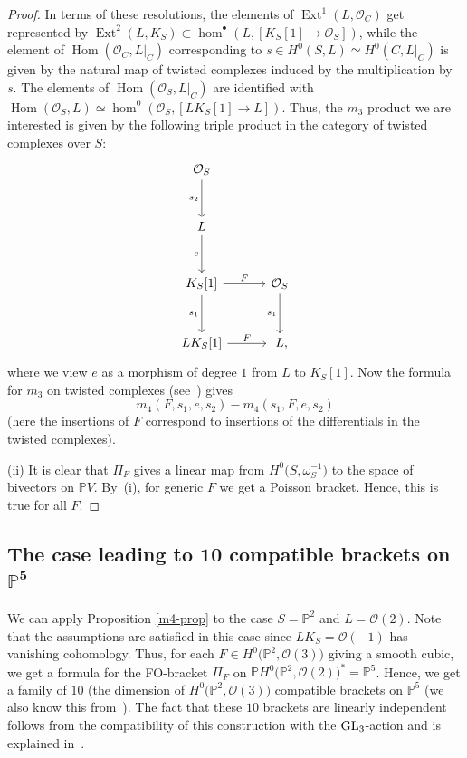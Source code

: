 \documentclass[10pt,a4paper]{amsart}
\numberwithin{equation}{section}
\renewcommand{\P}{{\mathbb P}}
\newcommand{\Hom}{\operatorname{Hom}}
\newcommand{\Ext}{\operatorname{Ext}}
\newcommand{\OO}{{\mathcal O}}
\newcommand{\sub}{\subset}
\newcommand{\om}{\omega}
\begin{document}
\begin{proof}
In terms of these resolutions, the elements of $\Ext^1(L,\OO_C)$ get represented by $\Ext^2(L,K_S)\sub \hom^\bullet(L,[K_S[1]\to \OO_S])$,
while the element of $\Hom(\OO_C,L|_C)$ corresponding to $s\in H^0(S,L)\simeq H^0(C,L|_C)$ is given by the natural map of twisted complexes
induced by the multiplication by~$s$. The elements of $\Hom(\OO_S,L|_C)$ are identified with $\Hom(\OO_S,L)\simeq \hom^0(\OO_S,[LK_S[1]\to L])$.
Thus, the $m_3$ product we are interested is given by the following triple product in the category of twisted complexes over $S$:
\[
\begin{tikzcd}[row sep=3em,column sep=3em]
\OO_S \arrow[d,"s_2"'] & \\
L \arrow[d,"e"'] & \\
K_S[1] \arrow[r,"F"]\arrow[d,"s_1"'] & \OO_S \arrow[d,"s_1"']\\
LK_S[1]\arrow[r,"F"] & \hphantom{,}L,
\end{tikzcd}
\]
where we view $e$ as a morphism of degree $1$ from $L$ to $K_S[1]$.
Now the formula for $m_3$ on twisted complexes (see~\cite[Section~7.6]{Keller}) gives
\[m_4(F,s_1,e,s_2)-m_4(s_1,F,e,s_2)\]
(here the insertions of $F$ correspond to insertions of the differentials in the twisted complexes).

(ii) It is clear that $\Pi_F$ gives a linear map from $H^0\big(S,\om_S^{-1}\big)$ to the space of bivectors on $\P V$. By~(i), for generic $F$ we get a Poisson bracket.
Hence, this is true for all $F$.
\end{proof}

\subsection[The case leading to 10 compatible brackets on P\^{}5]{The case leading to $\boldsymbol{10}$ compatible brackets on $\boldsymbol{\P^5}$}

We can apply Proposition \ref{m4-prop} to the case $S=\P^2$ and $L=\OO(2)$. Note that the assumptions are satisfied in this case since
$LK_S=\OO(-1)$ has vanishing cohomology. Thus, for each $F\in H^0\big(\P^2,\OO(3)\big)$ giving a smooth cubic, we get a formula for the FO-bracket
$\Pi_F$ on $\P H^0\big(\P^2,\OO(2)\big)^*=\P^5$.
Hence, we get a family of $10$ (the dimension of $H^0\big(\P^2,\OO(3)\big)$
compatible brackets on $\P^5$ (we also know this from~\cite[Proposition~4.7]{HP}). The fact that these $10$ brackets are linearly independent follows from the compatibility of this
construction with the ${\rm GL}_3$-action and is explained in~\cite[Proposition~4.7]{HP}.
\end{document}
